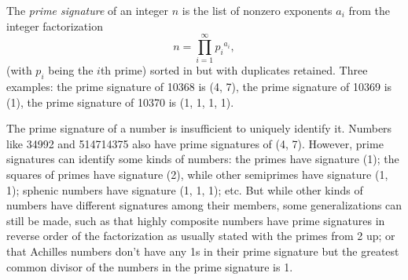 \documentclass[12pt]{article}
\begin{document}
The {\em prime signature} of an integer $n$ is the list of nonzero exponents $a_i$ from the integer factorization $$n = \prod_{i = 1}^{\infty} {p_i}^{a_i},$$ (with $p_i$ being the $i$th prime) sorted in  but with duplicates retained. Three examples: the prime signature of 10368 is (4, 7), the prime signature of 10369 is (1), the prime signature of 10370 is (1, 1, 1, 1).

The prime signature of a number is insufficient to uniquely identify it. Numbers like 34992 and 514714375 also have prime signatures of (4, 7). However, prime signatures can identify some kinds of numbers: the primes have signature (1); the squares of primes have signature (2), while other semiprimes have signature (1, 1); sphenic numbers have signature (1, 1, 1); etc. But while other kinds of numbers have different signatures among their members, some generalizations can still be made, such as that highly composite numbers have prime signatures in reverse order of the factorization as usually stated with the primes from 2 up; or that Achilles numbers don't have any 1s in their prime signature but the greatest common divisor of the numbers in the prime signature is 1.
\end{document}
